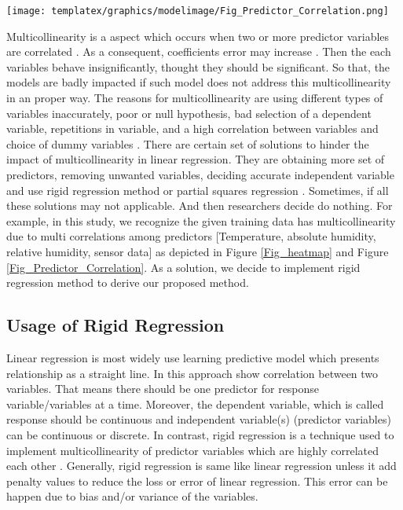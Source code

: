  \begin{figure*}[hbt!]
\centering
\texttt{[image: templatex/graphics/modelimage/Fig\_Predictor\_Correlation.png]}
\caption{Predictor Correlation Chart [Numerical representation for heatmap diagram]\cite{Bias2020} }
\label{Fig_Predictor_Correlation}
\end{figure*}

 Multicollinearity is a aspect which occurs when two or more predictor variables are correlated \cite{uyanik2013study}. 
 As a consequent, coefficients error may increase \cite{uyanik2013study}.
 Then the each variables behave insignificantly, thought they should be significant. 
 So that, the models are badly impacted if such model does not address this multicollinearity in an proper way.
 The reasons for multicollinearity are using different 
 types of variables inaccurately, poor or null hypothesis, bad selection of a dependent variable, 
 repetitions in variable, and 
 a high correlation between variables and choice of dummy variables \cite{farrar1967multicollinearity}.
 There are certain set of solutions to hinder the impact of multicollinearity in linear regression.
 They are obtaining more set of predictors, removing 
 unwanted variables, deciding accurate independent variable and use rigid regression method or partial squares regression \cite{farrar1967multicollinearity}.
 Sometimes, if all these solutions may not applicable.
 And then researchers decide do nothing.
 For example, in this study, we recognize the given training data has multicollinearity due to multi 
 correlations among predictors [Temperature, absolute humidity, relative humidity, sensor data] as depicted in Figure \ref{Fig_heatmap} and Figure \ref{Fig_Predictor_Correlation}.
 As a solution, we decide to implement rigid regression method to derive our proposed method.

\subsection{Usage of Rigid Regression}

Linear regression is most widely use learning predictive model 
which presents relationship as a straight line.
In this approach show correlation between two variables.
That means there should be one predictor for response variable/variables at a time.
Moreover, the dependent variable, which is called 
response should be continuous and independent 
variable(s) (predictor variables) can be continuous or discrete. 
In contrast, rigid regression is a technique used to 
implement multicollinearity of predictor variables which are highly correlated each other \cite{dong2016moving}.
Generally, rigid regression is same like linear regression unless it add penalty values to reduce the loss or error of linear regression.
This error can  be happen due to bias and/or variance of the variables.

